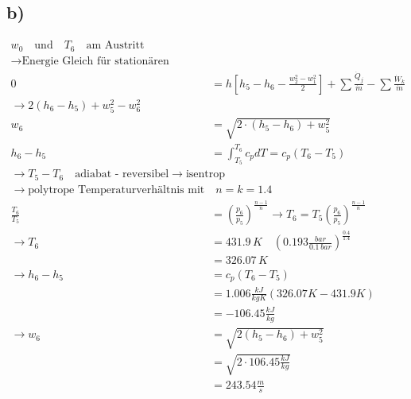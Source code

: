

\subsection*{b)}

\begin{align*}
    w_0 \quad \text{und} \quad T_6 \quad \text{am Austritt} \\
    \rightarrow \text{Energie Gleich für stationären Fließprozess} \\
    0 &= h \left[ h_5 - h_6 - \frac{w_2^2 - w_1^2}{2} \right] + \sum \frac{\dot{Q}_j}{\dot{m}} - \sum \frac{\dot{W}_k}{\dot{m}} \\
    \rightarrow 2 (h_6 - h_5) + w_5^2 - w_6^2 \\
    w_6 &= \sqrt{2 \cdot (h_5 - h_6) + w_5^2} \\
    h_6 - h_5 &= \int_{T_5}^{T_6} c_p dT = c_p (T_6 - T_5) \\
    \rightarrow T_5 - T_6 \quad \text{adiabat - reversibel} \rightarrow \text{isentrop} \\
    \rightarrow \text{polytrope Temperaturverhältnis mit} \quad n = k = 1.4 \\
    \frac{T_6}{T_5} &= \left( \frac{p_6}{p_5} \right)^{\frac{n-1}{n}} \rightarrow T_6 = T_5 \left( \frac{p_6}{p_5} \right)^{\frac{n-1}{n}} \\
    \rightarrow T_6 &= 431.9 \, K \quad \left( 0.193 \frac{bar}{0.1 \, bar} \right)^{\frac{0.4}{1.4}} \\
    &= 326.07 \, K \\
    \rightarrow h_6 - h_5 &= c_p (T_6 - T_5) \\
    &= 1.006 \frac{kJ}{kgK} (326.07 K - 431.9 K) \\
    &= -106.45 \frac{kJ}{kg} \\
    \rightarrow w_6 &= \sqrt{2 (h_5 - h_6) + w_5^2} \\
    &= \sqrt{2 \cdot 106.45 \frac{kJ}{kg}} \\
    &= 243.54 \frac{m}{s}
\end{align*}